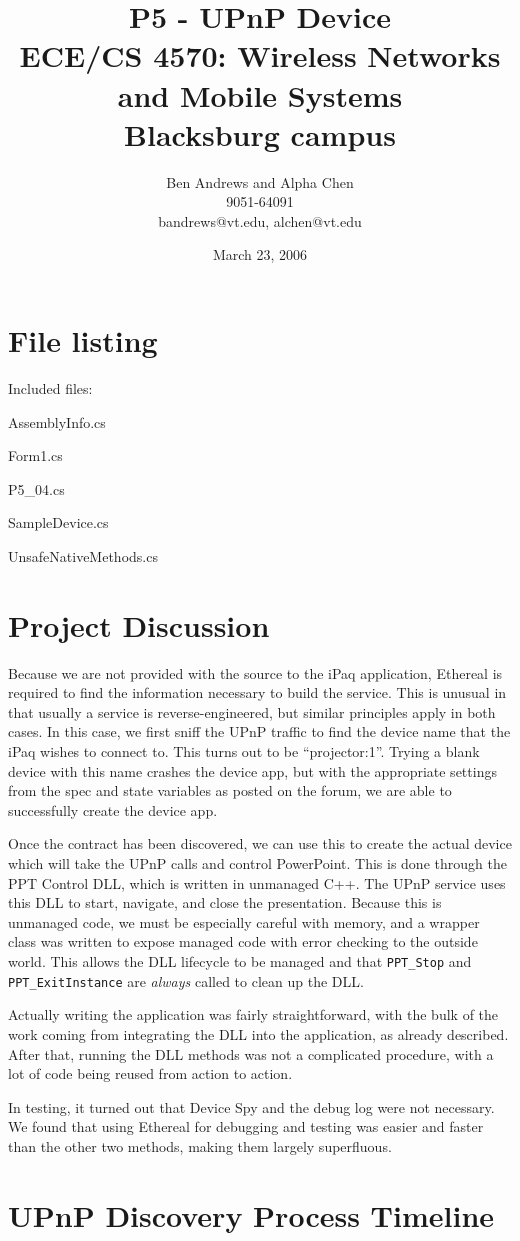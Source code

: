 \documentclass[11pt]{report}
\title{P5 - UPnP Device \\ \small ECE/CS 4570: Wireless Networks and Mobile Systems \\ Blacksburg campus}
\author{Ben Andrews and Alpha Chen \\ 9051-64091 \\ bandrews@vt.edu, alchen@vt.edu}
\date{March 23, 2006}
\newcommand{\Section}[1]{\newpage \section{#1}}
\begin{document}
\maketitle

\Section{File listing}

Included files:

AssemblyInfo.cs

Form1.cs

P5\_04.cs

SampleDevice.cs

UnsafeNativeMethods.cs

\Section{Project Discussion}

Because we are not provided with the source to the iPaq application, Ethereal is required to find the information necessary to build the service. This is unusual in that usually a service is reverse-engineered, but similar principles apply in both cases. In this case, we first sniff the UPnP traffic to find the device name that the iPaq wishes to connect to. This turns out to be ``projector:1''. Trying a blank device with this name crashes the device app, but with the appropriate settings from the spec and state variables as posted on the forum, we are able to successfully create the device app.

Once the contract has been discovered, we can use this to create the actual device which will take the UPnP calls and control PowerPoint. This is done through the PPT Control DLL, which is written in unmanaged C++. The UPnP service uses this DLL to start, navigate, and close the presentation. Because this is unmanaged code, we must be especially careful with memory, and a wrapper class was written to expose managed code with error checking to the outside world. This allows the DLL lifecycle to be managed and that \verb|PPT_Stop| and \verb|PPT_ExitInstance| are \emph{always} called to clean up the DLL.

Actually writing the application was fairly straightforward, with the bulk of the work coming from integrating the DLL into the application, as already described. After that, running the DLL methods was not a complicated procedure, with a lot of code being reused from action to action.

In testing, it turned out that Device Spy and the debug log were not necessary. We found that using Ethereal for debugging and testing was easier and faster than the other two methods, making them largely superfluous.

\Section{UPnP Discovery Process Timeline}
\end{document}

